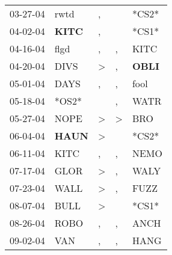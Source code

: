 \begin{supertabular}{p{0.07\textwidth}p{0.06\textwidth}p{0.02\textwidth}p{0.02\textwidth}p{0.06\textwidth}}
          03-27-04\textsuperscript{} &           rwtd\textsuperscript{} &                , &                  &                            *CS2* \\
          04-02-04\textsuperscript{} &  \textbf{KITC\textsuperscript{}} &                , &                  &                            *CS1* \\
          04-16-04\textsuperscript{} &           flgd\textsuperscript{} &                , &                , &           KITC\textsuperscript{} \\
          04-20-04\textsuperscript{} &           DIVS\textsuperscript{} &     \textgreater &                , &  \textbf{OBLI\textsuperscript{}} \\
          05-01-04\textsuperscript{} &           DAYS\textsuperscript{} &                , &                , &           fool\textsuperscript{} \\
          05-18-04\textsuperscript{} &                            *OS2* &                  &                , &           WATR\textsuperscript{} \\
          05-27-04\textsuperscript{} &           NOPE\textsuperscript{} &     \textgreater &     \textgreater &            BRO\textsuperscript{} \\
          06-04-04\textsuperscript{} &  \textbf{HAUN\textsuperscript{}} &     \textgreater &                  &                            *CS2* \\
          06-11-04\textsuperscript{} &           KITC\textsuperscript{} &                , &                , &           NEMO\textsuperscript{} \\
          07-17-04\textsuperscript{} &           GLOR\textsuperscript{} &     \textgreater &                , &           WALY\textsuperscript{} \\
          07-23-04\textsuperscript{} &           WALL\textsuperscript{} &     \textgreater &                , &           FUZZ\textsuperscript{} \\
          08-07-04\textsuperscript{} &           BULL\textsuperscript{} &     \textgreater &                  &                            *CS1* \\
          08-26-04\textsuperscript{} &           ROBO\textsuperscript{} &                , &                , &           ANCH\textsuperscript{} \\
          09-02-04\textsuperscript{} &            VAN\textsuperscript{} &                , &                , &           HANG\textsuperscript{} \\

\end{supertabular}
